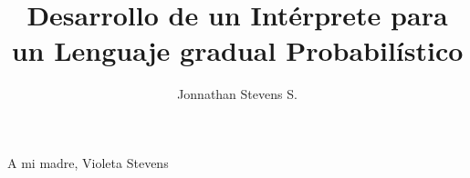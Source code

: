 \documentclass{umemoria}
\author{Jonnathan Stevens S.}
\title{Desarrollo de un Intérprete para un Lenguaje gradual Probabilístico}
\begin{document}
\frontmatter
\maketitle

\begin{resumen}
\end{resumen}


\begin{dedicatoria}
  A mi madre, Violeta Stevens
\end{dedicatoria}

\tableofcontents
\listoffigures

\mainmatter


\nocite{*}


\end{document}
